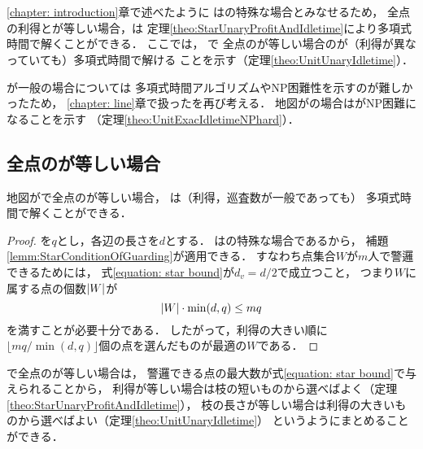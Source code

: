 \chapter{{\graphUnit}}
\label{chapter: unit}

\ref{chapter: introduction}章で述べたように
{\graphUnit}は{\graphStar}の特殊な場合とみなせるため，
全点の利得と{\maxIdletime}が等しい場合，{\PPProfit}は
定理\ref{theo:StarUnaryProfitAndIdletime}により多項式時間で解くことができる．
ここでは，
{\graphUnit}で
全点の{\maxIdletime}が等しい場合の{\PPProfit}が（利得が異なっていても）多項式時間で解ける
ことを示す（定理\ref{theo:UnitUnaryIdletime}）．

{\maxIdletime}が一般の場合については
多項式時間アルゴリズムやNP困難性を示すのが難しかったため，
\ref{chapter: line}章で扱った{\timeSpecifiedPPProfit}を再び考える．
地図が{\graphUnit}の場合は{\timeSpecifiedPPProfit}がNP困難になることを示す
（定理\ref{theo:UnitExacIdletimeNPhard}）．



\section{全点の{\maxIdletime}が等しい場合}
\label{section: UnitUnaryIdletime}

\begin{theo}
  \label{theo:UnitUnaryIdletime}
  地図が{\graphUnit}で全点の{\maxIdletime}が等しい場合，
  {\PPProfit}は（利得，巡査数が一般であっても）
  多項式時間で解くことができる．
\end{theo}

\begin{proof}
  {\maxIdletime}を$q$とし，各辺の長さを$d$とする．
  {\graphUnit}は{\graphStar}の特殊な場合であるから，
  補題\ref{lemm:StarConditionOfGuarding}が適用できる．
  すなわち点集合$W$が$m$人で警邏できるためには，
  式\eqref{equation: star bound}が$d _v = d / 2$で成立つこと，
  つまり$W$に属する点の個数$\lvert{W}\rvert$が
  \begin{equation}
    \lvert{W}\rvert \cdot \min (d, q) \leq m q
  \end{equation}
  を満すことが必要十分である．
  したがって，利得の大きい順に
  $\lfloor m q / \min (d, q) \rfloor$個の点を選んだものが最適の$W$である．
\end{proof}

{\graphStar}で全点の{\maxIdletime}が等しい場合は，
警邏できる点の最大数が式\eqref{equation: star bound}で与えられることから，
利得が等しい場合は枝の短いものから選べばよく（定理\ref{theo:StarUnaryProfitAndIdletime}），
枝の長さが等しい場合は利得の大きいものから選べばよい（定理\ref{theo:UnitUnaryIdletime}）
というようにまとめることができる．




